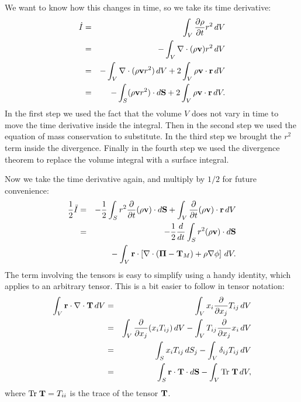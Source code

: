We want to know how this changes in time, so we take its time derivative:
\begin{eqnarray}
\dot{I} & = & \int_V \frac{\partial\rho}{\partial t} r^2 \,dV \\
& = & -\int_V \nabla \cdot (\rho \mathbf{v}) r^2\, dV \\
& = & -\int_V \nabla \cdot (\rho \mathbf{v} r^2)\, dV + 2\int_V \rho \mathbf{v}\cdot \mathbf{r}\, dV \\
& = & -\int_S (\rho \mathbf{v} r^2)\cdot d\mathbf{S} + 2\int_V \rho \mathbf{v}\cdot \mathbf{r}\, dV.
\end{eqnarray}
In the first step we used the fact that the volume $V$ does not vary in time to move the time derivative inside the integral. Then in the second step we used the equation of mass conservation to substitute. In the third step we brought the $r^2$ term inside the divergence. Finally in the fourth step we used the divergence theorem to replace the volume integral with a surface integral.

Now we take the time derivative again, and multiply by $1/2$ for future convenience:
\begin{eqnarray}
\frac{1}{2}\ddot{I} & = & -\frac{1}{2} \int_S r^2 \frac{\partial}{\partial t}(\rho\mathbf{v})\cdot d\mathbf{S} +
\int_V \frac{\partial}{\partial t}(\rho\mathbf{v})\cdot\mathbf{r} \, dV \\
& = & -\frac{1}{2} \frac{d}{dt} \int_S r^2 (\rho\mathbf{v})\cdot d\mathbf{S} 
\nonumber \\
& & \quad {} -
\int_V \mathbf{r} \cdot \left[\nabla\cdot(\boldsymbol{\Pi}-\mathbf{T}_M)+ \rho\nabla \phi \right] \, dV.
\end{eqnarray}
The term involving the tensors is easy to simplify using a handy identity, which applies to an arbitrary tensor. This is a bit easier to follow in tensor notation:
\begin{eqnarray}
\int_V \mathbf{r}\cdot \nabla\cdot \mathbf{T} \, dV & = & \int_V x_i \frac{\partial}{\partial x_j} T_{ij}\,dV \\
& = & \int_V \frac{\partial}{\partial x_j}(x_i T_{ij})\,dV - \int_V T_{ij} \frac{\partial}{\partial x_j}x_i \, dV \\
& = & \int_S x_i T_{ij} \,dS_j - \int_V \delta_{ij} T_{ij} \, dV \\
& = & \int_S \mathbf{r}\cdot\mathbf{T}\cdot d\mathbf{S} - \int_V \mbox{Tr}\; \mathbf{T} \, dV,
\end{eqnarray}
where $\mbox{Tr}\;\mathbf{T} = T_{ii}$ is the trace of the tensor $\mathbf{T}$.

